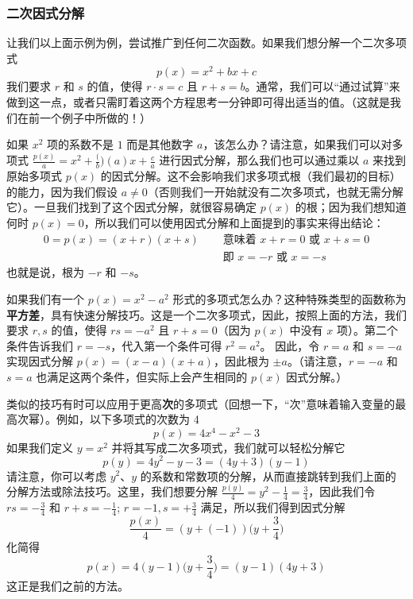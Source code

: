 \subsubsection*{二次因式分解}

让我们以上面示例为例，尝试推广到任何二次函数。如果我们想分解一个二次多项式
\[p(x) = x^2 + bx + c\]
我们要求 $r$ 和 $s$ 的值，使得 $r \cdot s = c$ 且 $r + s = b$。通常，我们可以``通过试算''来做到这一点，或者只需盯着这两个方程思考一分钟即可得出适当的值。（这就是我们在前一个例子中所做的！）

如果 $x^2$ 项的系数不是 $1$ 而是其他数字 $a$，该怎么办？请注意，如果我们可以对多项式 $\frac{p(x)}{a} = x^2+\frac(b)(a)x+\frac{c}{a}$ 进行因式分解，那么我们也可以通过乘以 $a$ 来找到原始多项式 $p(x)$ 的因式分解。这不会影响我们求多项式根（我们最初的目标）的能力，因为我们假设 $a \ne 0$（否则我们一开始就没有二次多项式，也就无需分解它）。一旦我们找到了这个因式分解，就很容易确定 $p(x)$ 的根；因为我们想知道何时 $p(x) = 0$，所以我们可以使用因式分解和上面提到的事实来得出结论：
\begin{align*}
    0 = p(x) = (x + r)(x + s) & \quad \text{ 意味着 } x + r = 0 \text{ 或 } x + s = 0 \\
    & \quad \text{ 即 } x = -r \text{ 或 } x = -s
\end{align*}
也就是说，根为 $-r$ 和 $-s$。

如果我们有一个 $p(x) = x^2 - a^2$ 形式的多项式怎么办？这种特殊类型的函数称为\textbf{平方差}，具有快速分解技巧。这是一个二次多项式，因此，按照上面的方法，我们要求 $r,s$ 的值，使得 $rs = -a^2$ 且 $r + s = 0$（因为 $p(x)$ 中没有 $x$ 项）。第二个条件告诉我们 $r = -s$，代入第一个条件可得 $r^2 = a^2$。 因此，令 $r = a$ 和 $s = -a$ 实现因式分解 $p(x) = (x - a)(x + a)$，因此根为 $\pm a$。（请注意，$r = -a$ 和 $s = a$ 也满足这两个条件，但实际上会产生相同的 $p(x)$ 因式分解。）

类似的技巧有时可以应用于更高\textbf{次}的多项式（回想一下，``次''意味着输入变量的最高次幂）。例如，以下多项式的次数为 4
\[p(x) = 4x^4 - x^2 - 3\]
如果我们定义 $y = x^2$ 并将其写成二次多项式，我们就可以轻松分解它
\[p(y) = 4y^2 - y - 3 = (4y + 3)(y - 1)\]
请注意，你可以考虑 $y^2$、$y$ 的系数和常数项的分解，从而直接跳转到我们上面的分解方法或除法技巧。这里，我们想要分解 $\frac{p(y)}{4} = y^2-\frac{1}{4}=\frac{3}{4}$，因此我们令 $rs = -\frac{3}{4}$ 和 $r + s =-\frac{1}{4}$; $r=-1, s=+\frac{3}{4}$ 满足，所以我们得到因式分解
\[\frac{p(x)}{4} = (y+(-1))\Big(y+\frac{3}{4}\Big)\]
化简得
\[p(x) = 4(y-1)\Big(y+\frac{3}{4}\Big) = (y-1)(4y+3)\]
这正是我们之前的方法。

